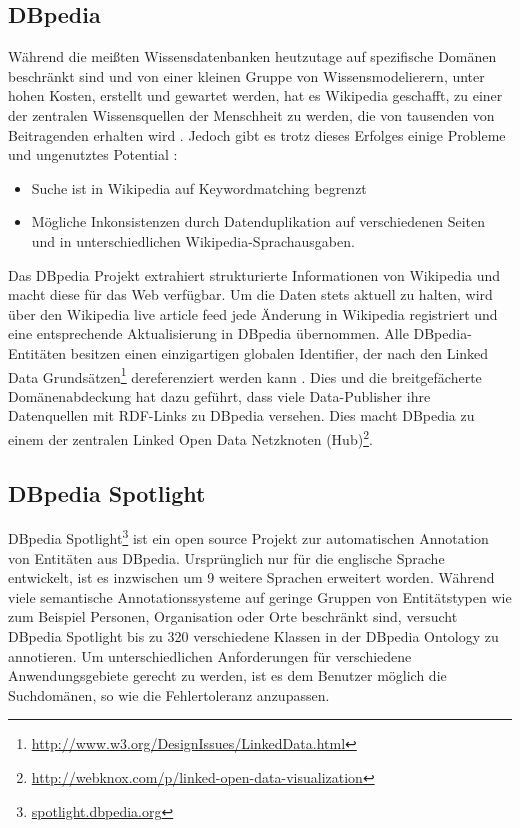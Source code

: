 \documentclass[11pt, a4paper, oneside]{Thesis} %
\begin{document}
\subsection{DBpedia}
W\"ahrend die mei\ss ten Wissensdatenbanken heutzutage auf spezifische Dom\"anen beschr\"ankt sind und von einer kleinen Gruppe von Wissensmodelierern, unter hohen Kosten, erstellt und gewartet werden, hat es Wikipedia geschafft, zu einer der zentralen Wissensquellen der Menschheit zu werden, die von tausenden von Beitragenden erhalten wird \citep{chr09}. Jedoch gibt es trotz dieses Erfolges einige Probleme und ungenutztes Potential \citep{moha12}:
\begin{itemize}
\item Suche ist in Wikipedia auf Keywordmatching begrenzt
\item M\"ogliche Inkonsistenzen durch Datenduplikation auf verschiedenen Seiten und in unterschiedlichen Wikipedia-Sprachausgaben.
\end{itemize}
Das DBpedia Projekt extrahiert strukturierte Informationen von Wikipedia und macht diese f\"ur das Web verf\"ugbar. Um die Daten stets aktuell zu halten, wird \"uber den Wikipedia live article feed jede \"Anderung in Wikipedia registriert und eine entsprechende Aktualisierung in DBpedia \"ubernommen. Alle DBpedia-Entit\"aten besitzen einen einzigartigen globalen Identifier, der nach den Linked Data Grunds\"atzen\footnote{\url{http://www.w3.org/DesignIssues/LinkedData.html}} dereferenziert werden kann \citep{chr09}. Dies und die breitgef\"acherte Dom\"anenabdeckung hat dazu gef\"uhrt, dass viele Data-Publisher ihre Datenquellen mit RDF-Links zu DBpedia versehen. Dies macht DBpedia zu einem der zentralen Linked Open Data Netzknoten (Hub)\footnote{\url{http://webknox.com/p/linked-open-data-visualization}}.

\subsection{DBpedia Spotlight}
DBpedia Spotlight\footnote{\url{spotlight.dbpedia.org}} ist ein open source Projekt zur automatischen Annotation von Entit\"aten aus DBpedia\citep{joch13}. Urspr\"unglich nur f\"ur die englische Sprache entwickelt, ist es inzwischen um 9 weitere Sprachen erweitert worden. W\"ahrend viele semantische Annotationssysteme auf geringe Gruppen von Entit\"atstypen wie zum Beispiel Personen, Organisation oder Orte beschr\"ankt sind, versucht DBpedia Spotlight bis zu 320 verschiedene Klassen in der DBpedia Ontology zu annotieren\citep{mend11}. Um unterschiedlichen Anforderungen f\"ur verschiedene Anwendungsgebiete gerecht zu werden, ist es dem Benutzer m\"oglich die Suchdom\"anen, so wie die Fehlertoleranz anzupassen.
\end{document}
